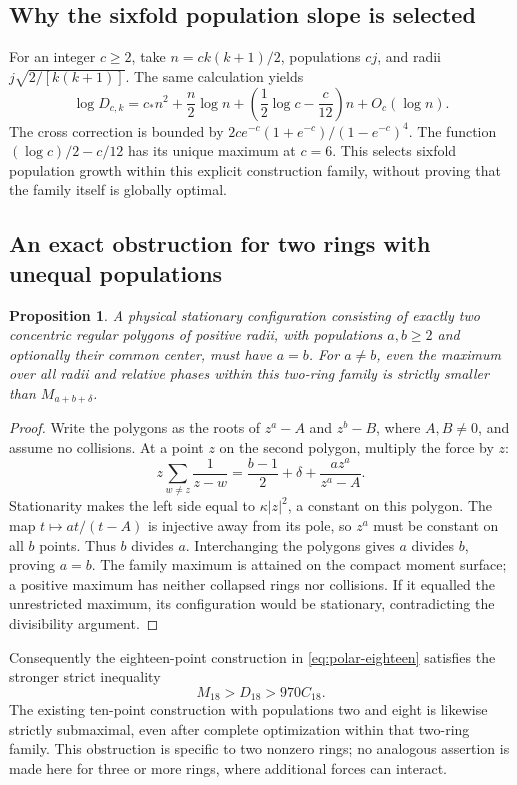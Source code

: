 \documentclass[11pt]{article}
\newtheorem{proposition}[theorem]{Proposition}
\theoremstyle{remark}
\numberwithin{equation}{section}
\begin{document}
\subsection{Why the sixfold population slope is selected}
For an integer $c\ge2$, take $n=ck(k+1)/2$, populations $cj$,
and radii $j\sqrt{2/[k(k+1)]}$.
The same calculation yields
\[
 \log D_{c,k}=c_*n^2+\frac n2\log n+
 \left(\frac12\log c-\frac c{12}\right)n+O_c(\log n).
\]
The cross correction is bounded by
$2ce^{-c}(1+e^{-c})/(1-e^{-c})^4$.
The function $(\log c)/2-c/12$ has its unique maximum at $c=6$.
This selects sixfold population growth within this explicit
construction family, without proving that the family itself is
globally optimal.

\subsection{An exact obstruction for two rings with unequal populations}
\begin{proposition}\label{prop:two-ring-population-obstruction}
A physical stationary configuration consisting of exactly two
concentric regular polygons of positive radii, with populations
$a,b\ge2$ and optionally their common center, must have $a=b$.
For $a\ne b$, even the maximum over all radii and relative phases
within this two-ring family is strictly smaller than $M_{a+b+\delta}$.
\end{proposition}

\begin{proof}
Write the polygons as the roots of $z^a-A$ and $z^b-B$,
where $A,B\ne0$, and assume no collisions.
At a point $z$ on the second polygon, multiply the force by $z$:
\[
 z\sum_{w\ne z}\frac1{z-w}
 =\frac{b-1}{2}+\delta+\frac{az^a}{z^a-A}.
\]
Stationarity makes the left side equal to
$\kappa|z|^2$, a constant on this polygon.
The map $t\mapsto at/(t-A)$ is injective away from its pole,
so $z^a$ must be constant on all $b$ points.  Thus $b$ divides $a$.
Interchanging the polygons gives $a$ divides $b$, proving $a=b$.
The family maximum is attained on the compact moment surface;
a positive maximum has neither collapsed rings nor collisions.
If it equalled the unrestricted maximum, its configuration would
be stationary, contradicting the divisibility argument.
\end{proof}

Consequently the eighteen-point construction in
\eqref{eq:polar-eighteen} satisfies the stronger strict inequality
\[
 M_{18}>D_{18}>970C_{18}.
\]
The existing ten-point construction with populations two and eight
is likewise strictly submaximal, even after complete optimization
within that two-ring family.  This obstruction is specific to
two nonzero rings; no analogous assertion is made here for
three or more rings, where additional forces can interact.
\end{document}
